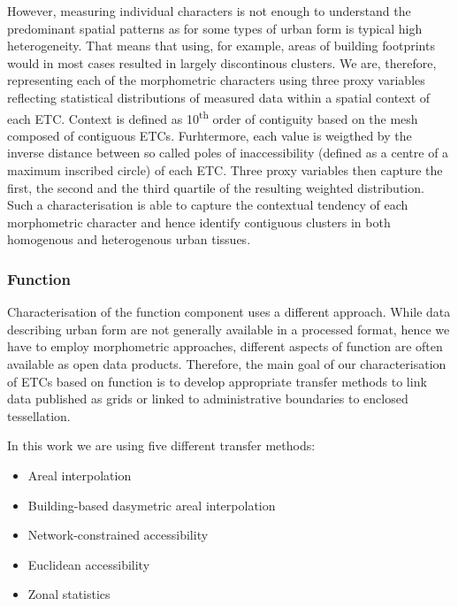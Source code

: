 However, measuring individual characters is not enough to understand the predominant
spatial patterns as for some types of urban form is typical high heterogeneity. That
means that using, for example, areas of building footprints would in most cases resulted
in largely discontinous clusters. We are, therefore, representing each of the
morphometric characters using three proxy variables reflecting statistical distributions
of measured data within a spatial context of each ETC. Context is defined as
10\textsuperscript{th}
order of contiguity based on the mesh composed of contiguous ETCs. Furhtermore, each
value is weigthed by the inverse distance between so called poles of inaccessibility
(defined as a centre of a maximum inscribed circle) of each ETC. Three proxy variables
then capture the first, the second and the third quartile of the resulting weighted
distribution. Such a characterisation is able to capture the contextual tendency of each
morphometric character and hence identify contiguous clusters in both homogenous and
heterogenous urban tissues.

\subsubsection*{Function}
Characterisation of the function component uses a different approach. While data
describing urban form are not generally available in a processed format, hence we have
to employ morphometric approaches, different aspects of function are often available as
open data products. Therefore, the main goal of our characterisation of ETCs based on
function is to develop appropriate transfer methods to link data published as grids or
linked to administrative boundaries to enclosed tessellation.

In this work we are using five different transfer methods:

\begin{itemize}
    \item Areal interpolation
    \item Building-based dasymetric areal interpolation
    \item Network-constrained accessibility
    \item Euclidean accessibility
    \item Zonal statistics
\end{itemize}


